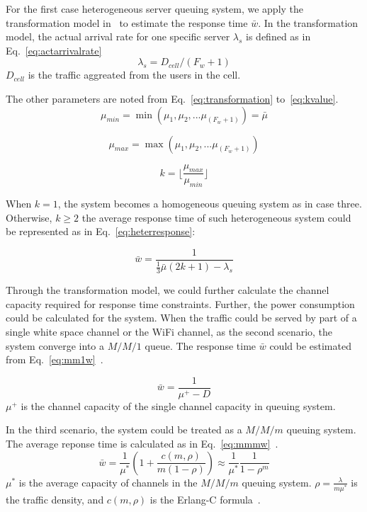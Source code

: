 For the first case heterogeneous server queuing system, we apply the transformation model 
in~\cite{yu2008transformation} to estimate the response time $\bar{w}$. 
In the transformation model, the actual arrival rate for one specific server $\lambda_s$ is 
defined as in Eq.~\ref{eq:actarrivalrate}
\begin{equation}
\label{eq:actarrivalrate}
\lambda_s=D_{cell}/(F_w+1)
\end{equation}
$D_{cell}$ is the traffic aggreated from the users in the cell.

The other parameters are noted from Eq.~\ref{eq:transformation} to~\ref{eq:kvalue}.
\begin{equation}
\label{eq:transformation}
\mu_{min}=\min{(\mu_1,\mu_2,...\mu_{(F_w+1)})} = \bar{\mu}
\end{equation}

\begin{equation}
\mu_{max}=\max{(\mu_1,\mu_2,...\mu_{(F_w+1)})} 
\end{equation}

\begin{equation}
\label{eq:kvalue}
k= \lfloor\frac{\mu_{max}}{\mu_{min}} \rfloor
\end{equation}

When $k=1$, the system becomes a homogeneous queuing system as in case three. Otherwise,   
$k\ge2$ the average response time of such heterogeneous system could be represented as in 
Eq.~\ref{eq:heterresponse}\cite{yu2008transformation}:

\begin{equation}
\label{eq:heterresponse}
\bar{w}=\frac{1}{\frac{1}{3}\bar{\mu}(2k+1)-\lambda_s}
\end{equation}

Through the transformation model, we could further calculate the channel capacity required for 
response time constraints. Further, the power consumption could be calculated for the system.
When the traffic could be served by part of a single white space channel or the WiFi channel, as 
the second scenario, the system converge into a $M/M/1$ queue. The response time $\bar{w}$ 
could be estimated from Eq.~\ref{eq:mm1w}~\cite{gelenbe1998introduction}.

\begin{equation}
\label{eq:mm1w}
\bar{w}=\frac{1}{\mu^+-D}
\end{equation}
$\mu^+$ is the channel capacity of the single channel capacity in queuing system.

In the third scenario, the system could be treated as a $M/M/m$ queuing system. 
The average reponse time is calculated as in Eq.~\ref{eq:mmmw}~\cite{gelenbe1998introduction}.
\begin{equation}
\label{eq:mmmw}
\bar{w} = \frac{1}{\mu^*}(1+\frac{c(m,\rho)}{m(1-\rho)})\approx \frac{1}{\mu^*}\frac{1}{1-\rho^m}
\end{equation}
$\mu^*$ is the average capacity of channels in the $M/M/m$ queuing system.
$\rho=\frac{\lambda}{m\mu^*}$ is the traffic density, and $c(m,\rho)$ is the Erlang-C 
formula~\cite{gelenbe1998introduction}.



